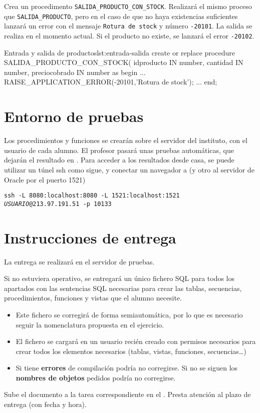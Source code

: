\begin{homeworkProblem}

  Crea un procedimento \texttt{SALIDA\_PRODUCTO\_CON\_STOCK}. Realizará el mismo proceso que \texttt{SALIDA\_PRODUCTO}, pero en el caso de que no haya existencias suficientes lanzará un error con el mensaje \texttt{Rotura de stock} y número \texttt{-20101}. La salida se realiza en el momento actual.
  Si el producto no existe, se lanzará el error \texttt{-20102}.

  \begin{listadosql}{Entrada y salida de productos}{lst:entrada-salida}
create or replace procedure SALIDA_PRODUCTO_CON_STOCK(
  idproducto IN number,
  cantidad IN number,
  preciocobrado IN number
as
begin
  ...
  RAISE_APPLICATION_ERROR(-20101,'Rotura de stock');
  ...
end; 
  \end{listadosql}
  
\end{homeworkProblem}

\section{Entorno de pruebas}
Los procedimientos y funciones se crearán sobre el servidor del instituto, con el usuario de cada alumno. El profesor pasará unas pruebas automáticas, que dejarán el resultado en . Para acceder a los resultados desde casa, se puede utilizar un túnel ssh como sigue, y conectar un navegador a  (y otro al servidor de Oracle por el puerto 1521)
\begin{center}
\texttt{ssh -L 8080:localhost:8080 -L 1521:localhost:1521 \textit{USUARIO}@213.97.191.51 -p 10133}
\end{center}

\section{Instrucciones de entrega}
La entrega se realizará en el servidor de pruebas.

Si no estuviera operativo, se entregará un único fichero SQL para todos los apartados con las sentencias SQL necesarias para crear las tablas, secuencias, procedimientos, funciones y vistas que el alumno necesite.
\begin{itemize}
\item Este fichero se corregirá de forma semiautomática, por lo que es necesario seguir la nomenclatura propuesta en el ejercicio.
\item El fichero se cargará en un usuario recién creado con permisos necesarios para crear todos los elementos necesarios (tablas, vistas, funciones, secuencias\dots)
\item Si tiene \textbf{errores} de compilación podría no corregirse. Si no se siguen los \textbf{nombres de objetos} pedidos podría no corregirse.
\end{itemize}

Sube el documento a la tarea correspondiente en el .
Presta atención al plazo de entrega (con fecha y hora).







